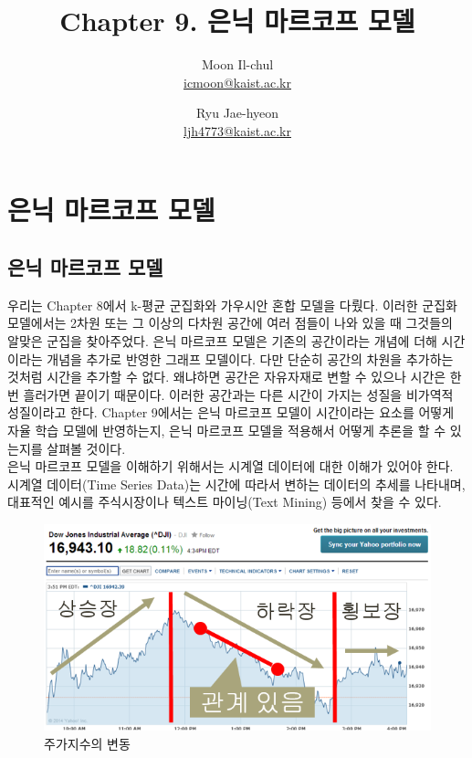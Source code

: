 \documentclass[a4paper]{oblivoir}
\author{Moon Il-chul \\ \href{mailto:icmoon@kaist.ac.kr}{icmoon@kaist.ac.kr} 
   \and Ryu Jae-hyeon
 \\ \href{mailto:ljh4773@kaist.ac.kr}{ljh4773@kaist.ac.kr} }
\title{Chapter 9. 은닉 마르코프 모델}
\begin{document}
\maketitle
\tableofcontents

\section{은닉 마르코프 모델}

\subsection{은닉 마르코프 모델}

우리는 Chapter 8에서 k-평균 군집화와 가우시안 혼합 모델을 다뤘다. 이러한 군집화 모델에서는 2차원 또는 그 이상의 다차원 공간에 여러 점들이 나와 있을 때 그것들의 알맞은 군집을 찾아주었다. 은닉 마르코프 모델은 기존의 공간이라는 개념에 더해 시간이라는 개념을 추가로 반영한 그래프 모델이다. 다만 단순히 공간의 차원을 추가하는 것처럼 시간을 추가할 수 없다. 왜냐하면 공간은 자유자재로 변할 수 있으나 시간은 한 번 흘러가면 끝이기 때문이다. 이러한 공간과는 다른 시간이 가지는 성질을 비가역적 성질이라고 한다. Chapter 9에서는 은닉 마르코프 모델이 시간이라는 요소를 어떻게 자율 학습 모델에 반영하는지, 은닉 마르코프 모델을 적용해서 어떻게 추론을 할 수 있는지를 살펴볼 것이다. \\

은닉 마르코프 모델을 이해하기 위해서는 시계열 데이터에 대한 이해가 있어야 한다. 시계열 데이터(Time Series Data)는 시간에 따라서 변하는 데이터의 추세를 나타내며, 대표적인 예시를 주식시장이나 텍스트 마이닝(Text Mining) 등에서 찾을 수 있다. \\

\begin{figure}[ht] \centering 
\includegraphics[scale=1.0]{fig9_1.png} 
\caption{주가지수의 변동}
\label{fig:9-1}
\end{figure}
\end{document}
